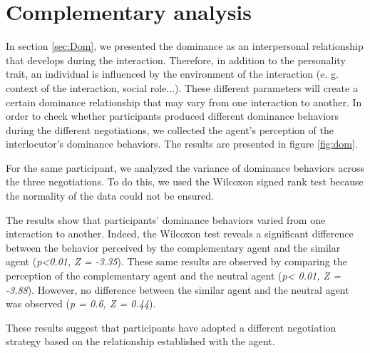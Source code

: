 \documentclass[10pt, a4paper]{article} %
\begin{document}
	\section{Complementary analysis}
	In section \ref{sec:Dom}, we presented the dominance as an interpersonal relationship that develops during the interaction. 
	Therefore, in addition to the personality trait, an individual is influenced by the environment of the interaction (e. g. context of the interaction, social role...). These different parameters will create a certain dominance relationship that may vary from one interaction to another.  
	In order to check whether participants produced different dominance behaviors during the different negotiations, we collected the agent's perception of the interlocutor's dominance behaviors.  The results are presented in figure \ref{fig:dom}.
	
	For the same participant, we analyzed the variance of dominance behaviors across the three negotiations. To do this, we used the Wilcoxon signed rank test because the normality of the data could not be ensured. 
	
	The results show that participants' dominance behaviors varied from one interaction to another. Indeed, the Wilcoxon test reveals a significant difference between the behavior perceived by the complementary agent and the similar agent (\emph{p<0.01, Z = -3.35}). These same results are observed by comparing the perception of the complementary agent and the neutral agent (\emph{p< 0.01, Z = -3.88}).
	However, no difference between the similar agent and the neutral agent was observed (\emph{p = 0.6, Z = 0.44}). 
	
	These results suggest that participants have adopted a different negotiation strategy based on the relationship established with the agent.
%		
%		
%		
\end{document}
